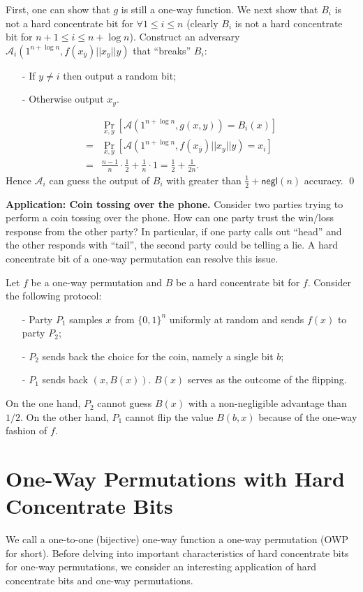 First, one can show that $g$ is still a one-way function. 
We next show that $B_i$ is not a hard concentrate bit for $\forall 1 \leq i \leq n$ (clearly $B_i$ is not a hard concentrate bit for $n+1 \leq i \leq n+\log n$).
Construct an adversary $\mathcal{A}_i(1^{n+\log n}, f(x_{\bar y}) || x_y || y)$ that ``breaks'' $B_i$:
\begin{itemize}
\item[-] If $y \not= i$ then output a random bit;
\item[-] Otherwise output $x_y$.
\end{itemize}
\begin{align*}
& \Pr_{x, y}[\mathcal{A}(1^{n+\log n}, g(x,y)) = B_i(x)]\\
=& \Pr_{x, y}[\mathcal{A}(1^{n+\log n}, f(x_{\bar y}) || x_y || y) = x_i]\\
=& \frac{n-1}{n} \cdot \frac{1}{2} + \frac{1}{n} \cdot 1 = \frac{1}{2} + \frac{1}{2n}.
\end{align*}
Hence $\mathcal{A}_i$ can guess the output of $B_i$ with greater than $\frac{1}{2} + \mathsf{negl}(n)$ accuracy.
\qed

\bigskip
\noindent\textbf{Application: Coin tossing over the phone.}
Consider two parties trying to perform a coin tossing over the phone.  How can one party trust the win/loss response from the other party?  In particular, if one party calls out ``head'' and the other responds with ``tail'', the second party could be telling a lie.
A hard concentrate bit of a one-way permutation can resolve this issue.

Let $f$ be a one-way permutation and $B$ be a hard concentrate bit for $f$. Consider the following protocol:
\begin{itemize}
\item[-] Party $P_1$ samples $x$ from $\{0,1\}^n$ uniformly at random and sends $f(x)$ to party $P_2$;
\item[-] $P_2$ sends back the choice for the coin, namely a single bit $b$;
\item[-] $P_1$ sends back $(x, B(x))$.  $B(x)$ serves as the outcome of the flipping.
\end{itemize}
On the one hand, $P_2$ cannot guess $B(x)$ with a non-negligible advantage than $1/2$.
On the other hand, $P_1$ cannot flip the value $B(b,x)$  because of the one-way fashion of $f$. 

\section{One-Way Permutations with Hard Concentrate Bits}
We call a one-to-one (bijective) one-way function a one-way permutation (OWP for short).
Before delving into important characteristics of hard concentrate bits for one-way permutations, we consider an interesting application of hard concentrate bits and one-way permutations.






